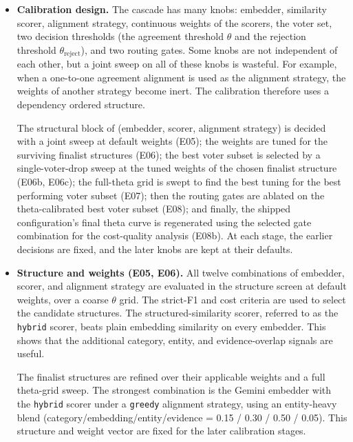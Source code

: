 \begin{itemize}[label={},leftmargin=1.5em]

    \item \textbf{Calibration design.} The cascade has many knobs: embedder, similarity scorer, alignment strategy, continuous weights of the scorers, the voter set, two decision thresholds (the agreement threshold $\theta$ and the rejection threshold $\theta_{\mathrm{reject}}$), and two routing gates. Some knobs are not independent of each other, but a joint sweep on all of these knobs is wasteful. For example, when a one-to-one agreement alignment is used as the alignment strategy, the weights of another strategy become inert. The calibration therefore uses a dependency ordered structure.
    
    The structural block of (embedder, scorer, alignment strategy) is decided with a joint sweep at default weights (E05); the weights are tuned for the surviving finalist structures (E06); the best voter subset is selected by a single-voter-drop sweep at the tuned weights of the chosen finalist structure (E06b, E06c); the full-theta grid is swept to find the best tuning for the best performing voter subset (E07); then the routing gates are ablated on the theta-calibrated best voter subset (E08); and finally, the shipped configuration's final theta curve is regenerated using the selected gate combination for the cost-quality analysis (E08b). At each stage, the earlier decisions are fixed, and the later knobs are kept at their defaults. 
    
    \item \textbf{Structure and weights (E05, E06).} 
    All twelve combinations of embedder, scorer, and alignment strategy are evaluated in the structure screen at default weights, over a coarse $\theta$ grid. The strict-F1 and cost criteria are used to select the candidate structures. The structured-similarity scorer, referred to as the \texttt{hybrid} scorer, beats plain embedding similarity on every embedder. This shows that the additional category, entity, and evidence-overlap signals are useful. 
    
    The finalist structures are refined over their applicable weights and a full theta-grid sweep. The strongest combination is the Gemini embedder with the \texttt{hybrid} scorer under a \texttt{greedy} alignment strategy, using an entity-heavy blend (category/embedding/entity/evidence = 0.15 / 0.30 / 0.50 / 0.05). This structure and weight vector are fixed for the later calibration stages.
    

\end{itemize}
